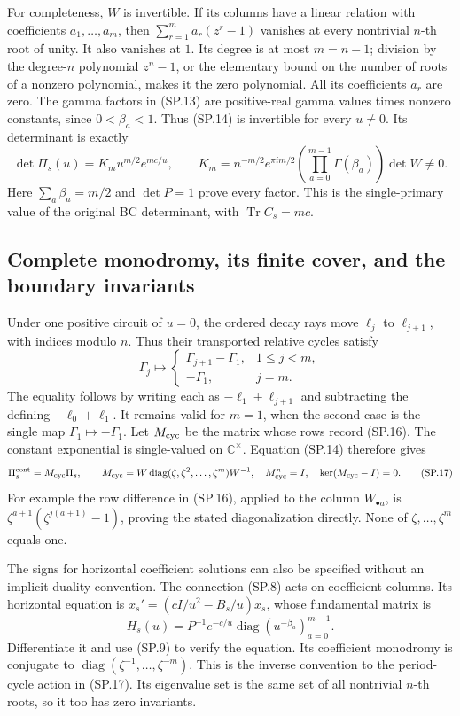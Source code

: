 For completeness, \(W\) is invertible. If its columns have a
linear relation with coefficients \(a_1,\ldots,a_m\), then
\(\sum_{r=1}^m a_r(z^r-1)\) vanishes at every nontrivial
\(n\)-th root of unity. It also vanishes at \(1\).
Its degree is at most \(m=n-1\); division by the degree-\(n\)
polynomial \(z^n-1\), or the elementary bound on the number of
roots of a nonzero polynomial, makes it the zero polynomial.
All its coefficients \(a_r\) are zero.
The gamma factors in (SP.13) are positive-real gamma values
times nonzero constants, since \(0<\beta_a<1\).
Thus (SP.14) is invertible for every \(u\ne0\).
Its determinant is exactly
\[
 \det\Pi_s(u)
 =K_m u^{m/2}e^{mc/u},\qquad
 K_m=n^{-m/2}e^{\pi im/2}
       \left(\prod_{a=0}^{m-1}\Gamma(\beta_a)\right)\det W\ne0.
 \tag{SP.15}\label{CFStage:eq:sp-det}
\]
Here \(\sum_a\beta_a=m/2\) and \(\det P=1\) prove every
factor. This is the single-primary value of the original BC
determinant, with \(\operatorname{Tr}C_s=mc\).

\subsection{Complete monodromy, its finite cover, and the boundary invariants}

Under one positive circuit of \(u=0\), the ordered decay rays
move \(\ell_j\) to \(\ell_{j+1}\), with indices modulo \(n\).
Thus their transported relative cycles satisfy
\[
 \Gamma_j\longmapsto
 \begin{cases}
  \Gamma_{j+1}-\Gamma_1,&1\le j<m,\\
  -\Gamma_1,&j=m.
 \end{cases}
 \tag{SP.16}\label{CFStage:eq:sp-cyclemonodromy}
\]
The equality follows by writing each as
\(-\ell_1+\ell_{j+1}\) and subtracting the defining
\(-\ell_0+\ell_1\). It remains valid for \(m=1\), when
the second case is the single map \(\Gamma_1\mapsto-\Gamma_1\).
Let \(M_{\rm cyc}\) be the matrix whose rows record (SP.16).
The constant exponential is single-valued on \(\mathbb C^\times\).
Equation (SP.14) therefore gives
\[
 \Pi_s^{\rm cont}
 =M_{\rm cyc}\Pi_s,\qquad
 M_{\rm cyc}
 =W\operatorname{diag}(\zeta,\zeta^2,\ldots,\zeta^m)W^{-1},
 \quad M_{\rm cyc}^n=I,\quad
 \ker(M_{\rm cyc}-I)=0 .
 \tag{SP.17}\label{CFStage:eq:sp-monodromy}
\]
For example the row difference in (SP.16), applied to the
column \(W_{\bullet a}\), is
\(\zeta^{a+1}(\zeta^{j(a+1)}-1)\), proving the stated
diagonalization directly. None of \(\zeta,\ldots,\zeta^m\)
equals one.

The signs for horizontal coefficient solutions can also be
specified without an implicit duality convention.
The connection (SP.8) acts on coefficient columns.
Its horizontal equation is
\(x_s'=(cI/u^2-B_s/u)x_s\), whose fundamental matrix is
\[
 H_s(u)=P^{-1}e^{-c/u}
           \operatorname{diag}(u^{-\beta_a})_{a=0}^{m-1}.
 \tag{SP.18}\label{CFStage:eq:sp-horizontal}
\]
Differentiate it and use (SP.9) to verify the equation.
Its coefficient monodromy is conjugate to
\(\operatorname{diag}(\zeta^{-1},\ldots,\zeta^{-m})\).
This is the inverse convention to the period-cycle action
in (SP.17). Its eigenvalue set is the same set of all
nontrivial \(n\)-th roots, so it too has zero invariants.

